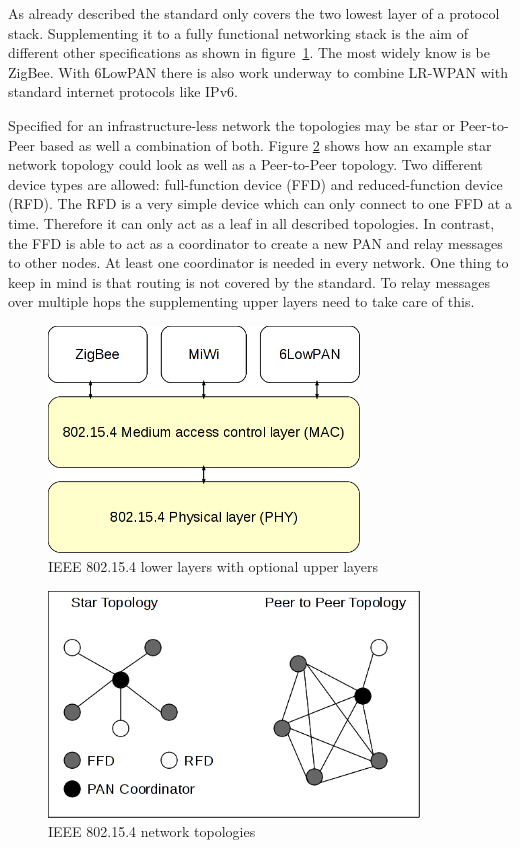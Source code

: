 As already described the standard only covers the two lowest layer of a
protocol stack. Supplementing it to a fully functional networking stack is the aim
of different other specifications as shown in figure~\ref{fig:802154layer}. The
most widely know is be ZigBee. With 6LowPAN there is also work underway to combine
LR-WPAN with standard internet protocols like IPv6.

Specified for an infrastructure-less network the topologies may be star or
Peer-to-Peer based as well a combination of both. Figure \ref{fig:802154topologies}
shows how an example star network topology could look as well as a Peer-to-Peer
topology. Two different device types are allowed: full-function device (FFD) and
reduced-function device (RFD). The RFD is a very simple device which can only
connect to one FFD at a time. Therefore it can only act as a leaf in all
described topologies. In contrast, the FFD is able to act as a coordinator to
create a new PAN and relay messages to other nodes. At least one coordinator
is needed in every network. One thing to keep in mind is that routing is not
covered by the standard. To relay messages over multiple hops the supplementing
upper layers need to take care of this.

\begin{figure}
  \begin{center}
    \includegraphics[height=6cm]{images/802154layer}
    \caption{IEEE 802.15.4 lower layers with optional upper layers}
        \label{fig:802154layer}
  \end{center}
\end{figure}

\begin{figure}
  \begin{center}
    \includegraphics[height=6cm]{images/802154topology}
    \caption{IEEE 802.15.4 network topologies}
        \label{fig:802154topologies}
  \end{center}
\end{figure}

